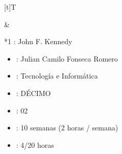 \documentclass[letterpaper,10pt,spanish]{sphinxmanual}
\begin{document}
\begin{savenotes}\sphinxattablestart
\sphinxthistablewithglobalstyle
\centering
\begin{tabular}[t]{}
\sphinxtoprule
\sphinxtableatstartofbodyhook

\begin{savenotes}\sphinxattablestart
\sphinxthistablewithglobalstyle
\centering
\begin{tabulary}{\linewidth}[t]{T}
\sphinxtoprule
\sphinxtableatstartofbodyhook
\sphinxAtStartPar
{}
\\
\sphinxbottomrule
\end{tabulary}
\sphinxtableafterendhook\par
\sphinxattableend\end{savenotes}
&

\begin{savenotes}\sphinxattablestart
\sphinxthistablewithglobalstyle
\raggedright
\begin{tabular}[t]{*{1}{}}
\sphinxtoprule
\sphinxtableatstartofbodyhook
\sphinxAtStartPar
{}: John F. Kennedy
\begin{itemize}
\item {} 
\sphinxAtStartPar
{}: Julian Camilo Fonseca Romero

\item {} 
\sphinxAtStartPar
{}: Tecnología e Informática

\item {} 
\sphinxAtStartPar
{}: DÉCIMO

\item {} 
\sphinxAtStartPar
{}: 02

\item {} 
\sphinxAtStartPar
{}: 10 semanas (2 horas / semana)

\item {} 
\sphinxAtStartPar
{}: 4/20 horas

\end{itemize}
\\
\sphinxbottomrule
\end{tabular}
\sphinxtableafterendhook\par
\sphinxattableend\end{savenotes}
\\
\sphinxbottomrule
\end{tabular}
\sphinxtableafterendhook\par
\sphinxattableend\end{savenotes}
\end{document}
